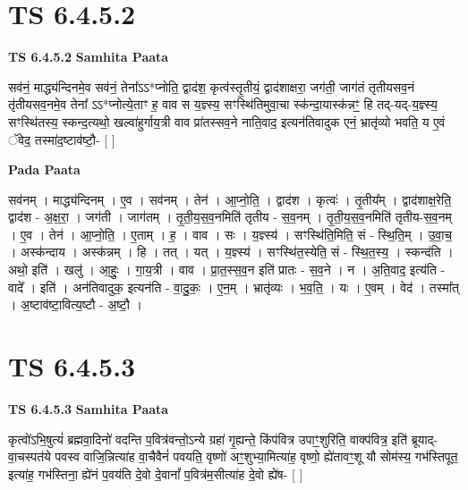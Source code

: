 \documentclass[17pt]{extarticle}
\begin{document}
\section*{ TS 6.4.5.2 }

\textbf{TS 6.4.5.2 } \newline
\textbf{Samhita Paata} \newline

सव॑नं॒ माद्ध्य॑न्दिनमे॒व सव॑नं॒ तेना᳚ऽऽ*प्नोति॒ द्वाद॑श॒ कृत्व॑स्तृ॒तीयं॒ द्वाद॑शाक्षरा॒ जग॑ती॒ जाग॑तं तृतीयसव॒नं तृ॑तीयसव॒नमे॒व तेना᳚ ऽऽ*प्नोत्ये॒ताꣳ ह॒ वाव स य॒ज्ञ्स्य॒ सꣳस्थि॑तिमुवा॒चा स्क॑न्दा॒यास्क॑न्नꣳ॒॒ हि तद्-यद्-य॒ज्ञ्स्य॒ सꣳस्थि॑तस्य॒ स्कन्द॒त्यथो॒ खल्वा॑हुर्गाय॒त्री वाव प्रा॑तस्सव॒ने नाति॒वाद॒ इत्यन॑तिवादुक एनं॒ भ्रातृ॑व्यो भवति॒ य ए॒वं ॅवेद॒ तस्मा॑द॒ष्टाव॑ष्टौ॒- [  ] \newline

\textbf{Pada Paata} \newline

सव॑नम् । माद्ध्य॑न्दिनम् । ए॒व । सव॑नम् । तेन॑ । आ॒प्नो॒ति॒ । द्वाद॑श । कृत्वः॑ । तृ॒तीय᳚म् । द्वाद॑शाक्ष॒रेति॒ द्वाद॑श - अ॒क्ष॒रा॒ । जग॑ती । जाग॑तम् । तृ॒ती॒य॒स॒व॒नमिति॑ तृतीय - स॒व॒नम् । तृ॒ती॒य॒स॒व॒नमिति॑ तृतीय-स॒व॒नम् । ए॒व । तेन॑ । आ॒प्नो॒ति॒ । ए॒ताम् । ह॒ । वाव । सः । य॒ज्ञ्स्य॑ । सꣳस्थि॑ति॒मिति॒ सं - स्थि॒ति॒म् । उ॒वा॒च॒ । अस्क॑न्दाय । अस्क॑न्नम् । हि । तत् । यत् । य॒ज्ञ्स्य॑ । सꣳस्थि॑त॒स्येति॒ सं - स्थि॒त॒स्य॒ । स्कन्द॑ति । अथो॒ इति॑ । खलु॑ । आ॒हुः॒ । गा॒य॒त्री । वाव । प्रा॒त॒स्स॒व॒न इति॑ प्रातः - स॒व॒ने । न । अ॒ति॒वाद॒ इत्य॑ति - वादे᳚ । इति॑ । अन॑तिवादुक॒ इत्यन॑ति - वा॒दु॒कः॒ । ए॒न॒म् । भ्रातृ॑व्यः । भ॒व॒ति॒ । यः । ए॒वम् । वेद॑ । तस्मा᳚त् । अ॒ष्टाव॑ष्टा॒वित्य॒ष्टौ - अ॒ष्टौ॒ ।  \newline




\section*{ TS 6.4.5.3 }

\textbf{TS 6.4.5.3 } \newline
\textbf{Samhita Paata} \newline

कृत्वो॑ऽभि॒षुत्यं॑ ब्रह्मवा॒दिनो॑ वदन्ति प॒वित्र॑वन्तो॒ऽन्ये ग्रहा॑ गृ॒ह्यन्ते॒ किंप॑वित्र उपाꣳ॒॒शुरिति॒ वाक्प॑वित्र॒ इति॑ ब्रूयाद्-वा॒चस्पत॑ये पवस्व वाजि॒न्नित्या॑ह वा॒चैवैनं॑ पवयति॒ वृष्णो॑ अꣳ॒॒शुभ्या॒मित्या॑ह॒ वृष्णो॒ ह्ये॑तावꣳ॒॒शू यौ सोम॑स्य॒ गभ॑स्तिपूत॒ इत्या॑ह॒ गभ॑स्तिना॒ ह्ये॑नं प॒वय॑ति दे॒वो दे॒वानां᳚ प॒वित्र॑म॒सीत्या॑ह दे॒वो ह्ये॑ष- [  ] \newline
\end{document}
